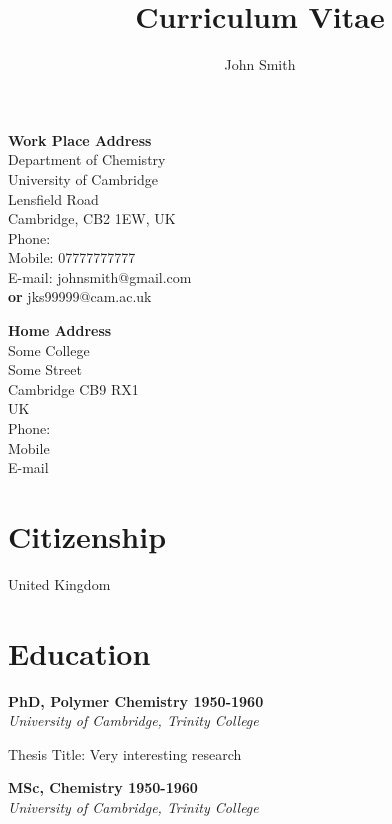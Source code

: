 \documentclass{scrvitae2}
\title{Curriculum Vitae}
\author{John Smith}
\begin{document}
\maketitle

\begin{minipage}[t]{.4\textwidth}
    \textbf{Work Place Address} \\
    Department of Chemistry     \\
    University of Cambridge     \\
    Lensfield Road              \\
    Cambridge, CB2 1EW, UK      \\
    Phone:                      \\
    Mobile: 07777777777         \\
    E-mail: johnsmith@gmail.com \\
    {\bf or} jks99999@cam.ac.uk
\end{minipage}
\hfill
\begin{minipage}[t]{.4\textwidth}
    \textbf{Home Address}       \\
    Some College                \\
    Some Street                 \\
    Cambridge CB9 RX1           \\
    UK                          \\
    Phone:                      \\
    Mobile                      \\
    E-mail             
\end{minipage}          

\section{Citizenship}                           
United Kingdom

\section{Education}
\textbf{PhD, Polymer Chemistry
\hfill 1950-1960}\\
{\em University of Cambridge, Trinity College}

Thesis Title: {Very interesting research}

\vspace{3pt}
\textbf{MSc, Chemistry
\hfill 1950-1960}\\
{\em University of Cambridge, Trinity College}
\end{document}
